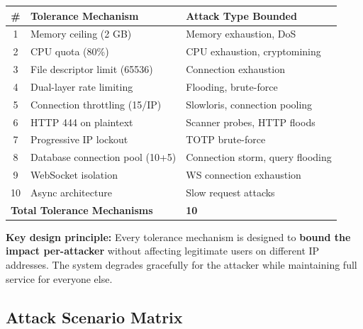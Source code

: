 \documentclass[11pt,a4paper]{article}
\begin{document}
\begin{center}
\begin{tabular}{cll}
\toprule
\textbf{\#} & \textbf{Tolerance Mechanism} & \textbf{Attack Type Bounded} \\
\midrule
1 & Memory ceiling (2 GB) & Memory exhaustion, DoS \\
2 & CPU quota (80\%) & CPU exhaustion, cryptomining \\
3 & File descriptor limit (65536) & Connection exhaustion \\
4 & Dual-layer rate limiting & Flooding, brute-force \\
5 & Connection throttling (15/IP) & Slowloris, connection pooling \\
6 & HTTP 444 on plaintext & Scanner probes, HTTP floods \\
7 & Progressive IP lockout & TOTP brute-force \\
8 & Database connection pool (10+5) & Connection storm, query flooding \\
9 & WebSocket isolation & WS connection exhaustion \\
10 & Async architecture & Slow request attacks \\
\midrule
\multicolumn{2}{l}{\textbf{Total Tolerance Mechanisms}} & \textbf{10} \\
\bottomrule
\end{tabular}
\end{center}

\vspace{1em}

\textbf{Key design principle:} Every tolerance mechanism is designed to \textbf{bound the impact per-attacker} without affecting legitimate users on different IP addresses. The system degrades gracefully for the attacker while maintaining full service for everyone else.

\subsection{Attack Scenario Matrix}
\end{document}
